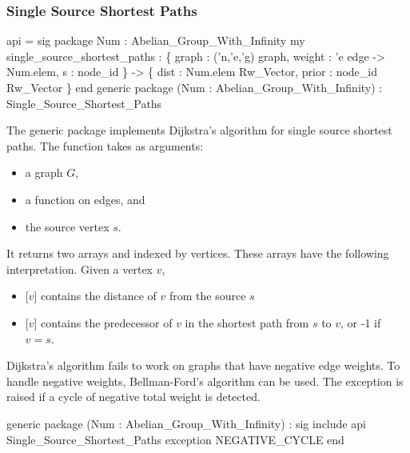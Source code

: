 \subsubsection{Single Source Shortest Paths}
\begin{SML}
 api  = sig 
   package Num : Abelian_Group_With_Infinity
   my single_source_shortest_paths :
                 \{ graph : ('n,'e,'g) graph,
                   weight : 'e edge -> Num.elem,
                   s : node_id
                 \} ->
                 \{ dist : Num.elem Rw_Vector,
                   prior :  node_id Rw_Vector
                 \}
 end
 generic package (Num : Abelian_Group_With_Infinity) 
    : Single_Source_Shortest_Paths
\end{SML}
The generic package  implements Dijkstra's algorithm
for single source shortest paths.  The function \linebreak
{} takes as arguments: 
\begin{itemize}
\item a graph $G$, 
\item a  function on edges, and
\item the source vertex $s$.
\end{itemize}
It returns two arrays  and 
indexed by vertices.  These arrays have the following
interpretation.  Given a vertex $v$,
\begin{itemize}
\item {}[$v$] contains the distance of $v$ from the source $s$
\item {}[$v$] contains the predecessor of $v$ in the shortest
path from $s$ to $v$, or -1 if $v=s$.
\end{itemize}

Dijkstra's algorithm fails to work on graphs that have
negative edge weights.  
To handle negative weights, Bellman-Ford's algorithm can be used. 
The exception  is raised if a cycle of
negative total weight is detected.
\begin{SML}
 generic package (Num : Abelian_Group_With_Infinity) : sig
    include api Single_Source_Shortest_Paths
    exception NEGATIVE_CYCLE
 end
\end{SML}
